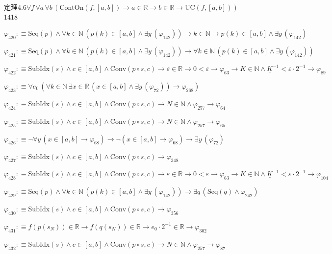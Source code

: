 \begin{fullproof}{定理4.6}{$\forall f\,\forall a\,\forall b\,(\mathrm{ContOn}(f,[a,b]) \to a \in \mathbb{R} \to b \in \mathbb{R} \to \mathrm{UC}(f,[a,b]))$}{1418}
\begin{abbrevlist}
\item $\varphi_{420} :\equiv \mathrm{Seq}(p) \land \forall k \in \mathbb{N}\,(p(k) \in [a,b] \land \exists y\,(\varphi_{142})) \to k \in \mathbb{N} \to p(k) \in [a,b] \land \exists y\,(\varphi_{142})$
\item $\varphi_{421} :\equiv \mathrm{Seq}(p) \land \forall k \in \mathbb{N}\,(p(k) \in [a,b] \land \exists y\,(\varphi_{142})) \to \forall k \in \mathbb{N}\,(p(k) \in [a,b] \land \exists y\,(\varphi_{142}))$
\item $\varphi_{422} :\equiv \mathrm{SubIdx}(s) \land c \in [a,b] \land \mathrm{Conv}(p \circ s,c) \to \varepsilon \in \mathbb{R} \to 0 < \varepsilon \to \varphi_{63} \to K \in \mathbb{N} \land \underline{K}^{-1} < \varepsilon \cdot 2^{-1} \to \varphi_{89}$
\item $\varphi_{423} :\equiv \forall e_{0}\,(\forall k \in \mathbb{N}\,\exists x \in \mathbb{R}\,(x \in [a,b] \land \exists y\,(\varphi_{72})) \to \varphi_{268})$
\item $\varphi_{424} :\equiv \mathrm{SubIdx}(s) \land c \in [a,b] \land \mathrm{Conv}(p \circ s,c) \to N \in \mathbb{N} \land \varphi_{257} \to \varphi_{64}$
\item $\varphi_{425} :\equiv \mathrm{SubIdx}(s) \land c \in [a,b] \land \mathrm{Conv}(p \circ s,c) \to N \in \mathbb{N} \land \varphi_{257} \to \varphi_{65}$
\item $\varphi_{426} :\equiv \neg \forall y\,(x \in [a,b] \to \varphi_{68}) \to \neg (x \in [a,b] \to \varphi_{68}) \to \exists y\,(\varphi_{72})$
\item $\varphi_{427} :\equiv \mathrm{SubIdx}(s) \land c \in [a,b] \land \mathrm{Conv}(p \circ s,c) \to \varphi_{348}$
\item $\varphi_{428} :\equiv \mathrm{SubIdx}(s) \land c \in [a,b] \land \mathrm{Conv}(p \circ s,c) \to \varepsilon \in \mathbb{R} \to 0 < \varepsilon \to \varphi_{63} \to K \in \mathbb{N} \land \underline{K}^{-1} < \varepsilon \cdot 2^{-1} \to \varphi_{104}$
\item $\varphi_{429} :\equiv \mathrm{Seq}(p) \land \forall k \in \mathbb{N}\,(p(k) \in [a,b] \land \exists y\,(\varphi_{142})) \to \exists q\,(\mathrm{Seq}(q) \land \varphi_{242})$
\item $\varphi_{430} :\equiv \mathrm{SubIdx}(s) \land c \in [a,b] \land \mathrm{Conv}(p \circ s,c) \to \varphi_{356}$
\item $\varphi_{431} :\equiv f(p(s_{N})) \in \mathbb{R} \to f(q(s_{N})) \in \mathbb{R} \to e_{0} \cdot 2^{-1} \in \mathbb{R} \to \varphi_{302}$
\item $\varphi_{432} :\equiv \mathrm{SubIdx}(s) \land c \in [a,b] \land \mathrm{Conv}(p \circ s,c) \to N \in \mathbb{N} \land \varphi_{257} \to \varphi_{87}$

\end{abbrevlist}
\end{fullproof}
